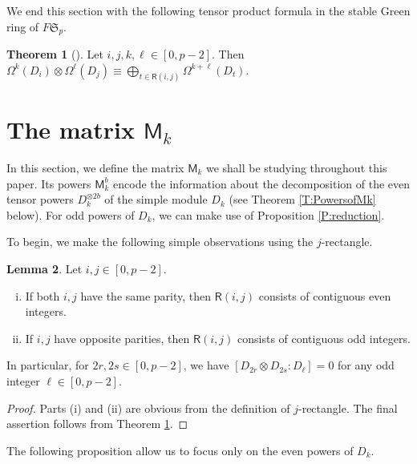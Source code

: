 \documentclass[12pt,reqno]{amsart}
\newcommand{\Rect}{\mathsf{R}}
\newcommand{\sym}[1]{\mathfrak{S}_{#1}}
\newcommand{\F}{{F}}
\newcommand{\M}{\mathsf{M}}
\theoremstyle{definition}
\newtheorem{thm}{Theorem}[section]
\newtheorem{lem}[thm]{Lemma}
\numberwithin{equation}{section}
\begin{document}
We end this section with the following tensor product formula in the stable Green ring of $\F\sym{p}$. 

\begin{thm}[{\cite[Theorem 4.2]{kualim1}}]\label{T:StableGreenRing} Let $i,j,k,\ell\in [0,p-2]$. Then $\Omega^k(D_i)\otimes \Omega^\ell(D_j)\equiv \bigoplus_{t\in\Rect(i,j)}\Omega^{k+\ell}(D_t)$.
\end{thm}

\section{The matrix $\M_k$}\label{S:Mk}

In this section, we define the matrix $\M_k$ we shall be studying throughout this paper. Its powers $\M_k^b$ encode the information about the decomposition of the even tensor powers $D_k^{\otimes 2b}$ of the simple module $D_k$ (see Theorem \ref{T:PowersofMk} below). For odd powers of $D_k$, we can make use of Proposition \ref{P:reduction}. 

To begin, we make the following simple observations using the $j$-rectangle. 

\begin{lem}\label{L:Rect}
    Let $i,j\in [0,p-2]$. 
    \begin{enumerate}[(i)]
        \item If both $i,j$ have the same parity, then $\Rect(i,j)$ consists of contiguous even integers.
        \item If $i,j$ have opposite parities, then $\Rect(i,j)$ consists of contiguous odd integers.
    \end{enumerate} In particular, for $2r,2s\in [0,p-2]$, we have $[D_{2r}\otimes D_{2s}:D_\ell]=0$ for any odd integer $\ell\in [0,p-2]$.
\end{lem}
\begin{proof}
    Parts (i) and (ii) are obvious from the definition of $j$-rectangle. The final assertion follows from Theorem \ref{T:StableGreenRing}.
\end{proof}

The following proposition allow us to focus only on the even powers of $D_k$.  
\end{document}
